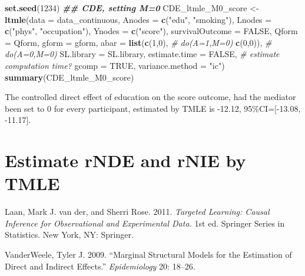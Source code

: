 \documentclass[
]{book}
\newenvironment{Shaded}{\begin{snugshade}}{\end{snugshade}}
\newcommand{\AttributeTok}[1]{\textcolor[rgb]{0.13,0.29,0.53}{#1}}
\newcommand{\CommentTok}[1]{\textcolor[rgb]{0.56,0.35,0.01}{\textit{#1}}}
\newcommand{\ConstantTok}[1]{\textcolor[rgb]{0.56,0.35,0.01}{#1}}
\newcommand{\DecValTok}[1]{\textcolor[rgb]{0.00,0.00,0.81}{#1}}
\newcommand{\DocumentationTok}[1]{\textcolor[rgb]{0.56,0.35,0.01}{\textbf{\textit{#1}}}}
\newcommand{\FunctionTok}[1]{\textcolor[rgb]{0.13,0.29,0.53}{\textbf{#1}}}
\newcommand{\NormalTok}[1]{#1}
\newcommand{\OtherTok}[1]{\textcolor[rgb]{0.56,0.35,0.01}{#1}}
\newcommand{\StringTok}[1]{\textcolor[rgb]{0.31,0.60,0.02}{#1}}
\newlength{\cslhangindent}
\newenvironment{CSLReferences}[2] %
 {\begin{list}{}{%
  \setlength{\itemindent}{0pt}
  \setlength{\leftmargin}{0pt}
  \setlength{\parsep}{0pt}
  \ifodd #1
   \setlength{\leftmargin}{\cslhangindent}
   \setlength{\itemindent}{-1\cslhangindent}
  \fi
  \setlength{\itemsep}{#2\baselineskip}}}
 {\end{list}}
\begin{document}
\begin{Shaded}
\begin{Highlighting}[]
\FunctionTok{set.seed}\NormalTok{(}\DecValTok{1234}\NormalTok{)}
\DocumentationTok{\#\# CDE, setting M=0}
\NormalTok{CDE\_ltmle\_M0\_score }\OtherTok{\textless{}{-}} \FunctionTok{ltmle}\NormalTok{(}\AttributeTok{data =}\NormalTok{ data\_continuous,}
                            \AttributeTok{Anodes =} \FunctionTok{c}\NormalTok{(}\StringTok{"edu"}\NormalTok{, }\StringTok{"smoking"}\NormalTok{),}
                            \AttributeTok{Lnodes =} \FunctionTok{c}\NormalTok{(}\StringTok{"phys"}\NormalTok{, }\StringTok{"occupation"}\NormalTok{), }
                            \AttributeTok{Ynodes =} \FunctionTok{c}\NormalTok{(}\StringTok{"score"}\NormalTok{),}
                            \AttributeTok{survivalOutcome =} \ConstantTok{FALSE}\NormalTok{, }
                            \AttributeTok{Qform =}\NormalTok{ Qform,}
                            \AttributeTok{gform =}\NormalTok{ gform,}
                            \AttributeTok{abar =} \FunctionTok{list}\NormalTok{(}\FunctionTok{c}\NormalTok{(}\DecValTok{1}\NormalTok{,}\DecValTok{0}\NormalTok{), }\CommentTok{\# do(A=1,M=0)}
                                        \FunctionTok{c}\NormalTok{(}\DecValTok{0}\NormalTok{,}\DecValTok{0}\NormalTok{)), }\CommentTok{\#  do(A=0,M=0)}
                            \AttributeTok{SL.library =}\NormalTok{ SL.library,}
                            \AttributeTok{estimate.time =} \ConstantTok{FALSE}\NormalTok{, }\CommentTok{\# estimate computation time?}
                            \AttributeTok{gcomp =} \ConstantTok{TRUE}\NormalTok{,}
                            \AttributeTok{variance.method =} \StringTok{"ic"}\NormalTok{)}
\FunctionTok{summary}\NormalTok{(CDE\_ltmle\_M0\_score)}
\end{Highlighting}
\end{Shaded}

The controlled direct effect of education on the score outcome, had the mediator been set to 0 for every participant, estimated by TMLE is -12.12, 95\%CI={[}-13.08, -11.17{]}.

\chapter{Estimate rNDE and rNIE by TMLE}\label{estimate-rnde-and-rnie-by-tmle}

\label{refs}
\begin{CSLReferences}{1}{0}
Laan, Mark J. van der, and Sherri Rose. 2011. \emph{Targeted Learning: Causal Inference for Observational and Experimental Data.} 1st ed. Springer Series in Statistics. New York, NY: Springer.

VanderWeele, Tyler J. 2009. {``Marginal Structural Models for the Estimation of Direct and Indirect Effects.''} \emph{Epidemiology} 20: 18--26.

\end{CSLReferences}
\end{document}
